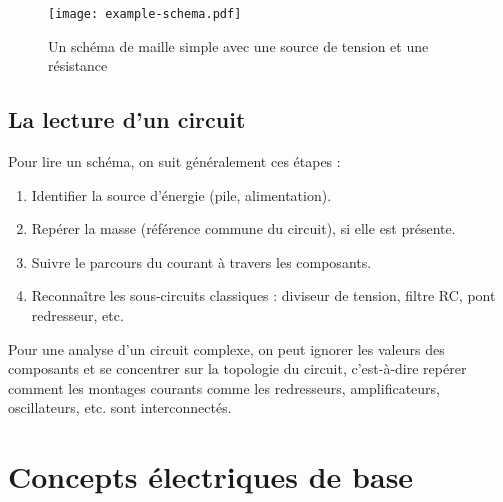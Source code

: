 \begin{figure}[H]
    \texttt{[image: example-schema.pdf]}
    \caption{
        Un sch\'ema de maille simple avec une source de tension et une r\'esistance
    }
\end{figure}

\subsection{La lecture d’un circuit}

\begin{Note}
Pour lire un sch\'ema, on suit g\'en\'eralement ces \'etapes :
\begin{enumerate}
  \item Identifier la source d’\'energie (pile, alimentation).
  \item Rep\'erer la masse (r\'ef\'erence commune du circuit), si elle est pr\'esente.
  \item Suivre le parcours du courant à travers les composants.
  \item Reconna\^itre les sous-circuits classiques : diviseur de tension, filtre RC, pont redresseur, etc.
\end{enumerate}

Pour une analyse d'un circuit complexe, on peut ignorer les valeurs des composants et se concentrer sur la topologie du circuit,
c'est-à-dire rep\'erer comment les montages courants comme les redresseurs, amplificateurs, oscillateurs, etc. sont interconnect\'es.
\end{Note}

\section{Concepts \'electriques de base}
